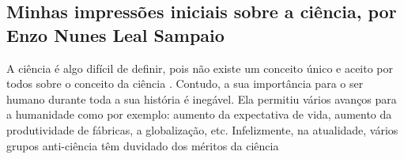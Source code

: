 \subsection{Minhas impressões iniciais sobre a ciência, por Enzo Nunes Leal Sampaio}

A ciência é algo difícil de definir, pois não existe um conceito único e aceito por todos sobre o conceito da ciência \citet{schwartzman_ciencia_1984}. Contudo, a sua importância para o ser humano durante toda a sua história é inegável. Ela permitiu vários avanços para a humanidade como por exemplo: aumento da expectativa de vida, aumento da produtividade de fábricas, a globalização, etc. Infelizmente, na atualidade, vários grupos anti-ciência têm duvidado dos méritos da ciência